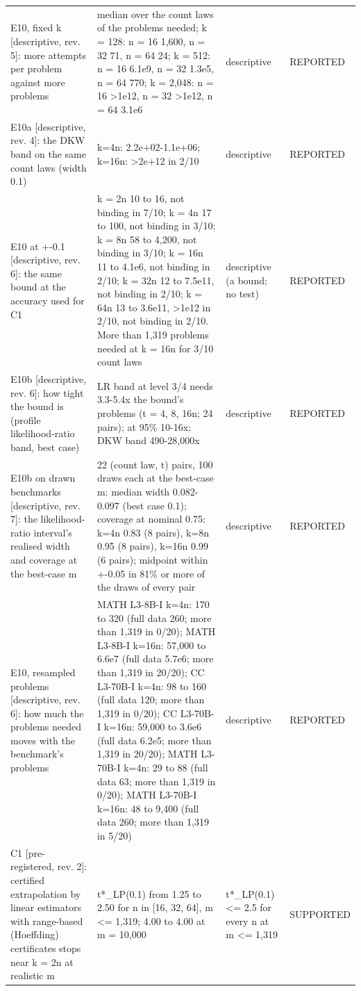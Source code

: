 \begin{table}[t]
\begin{tabular}{p{1.6in}p{2.0in}p{0.95in}p{0.75in}}
E10, fixed k [descriptive, rev. 5]: more attempts per problem against more problems & median over the count laws of the problems needed; k = 128: n = 16 1,600, n = 32 71, n = 64 24; k = 512: n = 16 6.1e9, n = 32 1.3e5, n = 64 770; k = 2,048: n = 16 >1e12, n = 32 >1e12, n = 64 3.1e6 & descriptive & REPORTED \\
E10a [descriptive, rev. 4]: the DKW band on the same count laws (width 0.1) & k=4n: 2.2e+02-1.1e+06; k=16n: >2e+12 in 2/10 & descriptive & REPORTED \\
E10 at +-0.1 [descriptive, rev. 6]: the same bound at the accuracy used for C1 & k = 2n 10 to 16, not binding in 7/10; k = 4n 17 to 100, not binding in 3/10; k = 8n 58 to 4,200, not binding in 3/10; k = 16n 11 to 4.1e6, not binding in 2/10; k = 32n 12 to 7.5e11, not binding in 2/10; k = 64n 13 to 3.6e11, >1e12 in 2/10, not binding in 2/10. More than 1,319 problems needed at k = 16n for 3/10 count laws & descriptive (a bound; no test) & REPORTED \\
E10b [descriptive, rev. 6]: how tight the bound is (profile likelihood-ratio band, best case) & LR band at level 3/4 needs 3.3-5.4x the bound's problems (t = 4, 8, 16n; 24 pairs); at 95\% 10-16x; DKW band 490-28,000x & descriptive & REPORTED \\
E10b on drawn benchmarks [descriptive, rev. 7]: the likelihood-ratio interval's realised width and coverage at the best-case m & 22 (count law, t) pairs, 100 draws each at the best-case m: median width 0.082-0.097 (best case 0.1); coverage at nominal 0.75: k=4n 0.83 (8 pairs), k=8n 0.95 (8 pairs), k=16n 0.99 (6 pairs); midpoint within +-0.05 in 81\% or more of the draws of every pair & descriptive & REPORTED \\
E10, resampled problems [descriptive, rev. 6]: how much the problems needed moves with the benchmark's problems & MATH L3-8B-I k=4n: 170 to 320 (full data 260; more than 1,319 in 0/20); MATH L3-8B-I k=16n: 57,000 to 6.6e7 (full data 5.7e6; more than 1,319 in 20/20); CC L3-70B-I k=4n: 98 to 160 (full data 120; more than 1,319 in 0/20); CC L3-70B-I k=16n: 59,000 to 3.6e6 (full data 6.2e5; more than 1,319 in 20/20); MATH L3-70B-I k=4n: 29 to 88 (full data 63; more than 1,319 in 0/20); MATH L3-70B-I k=16n: 48 to 9,400 (full data 260; more than 1,319 in 5/20) & descriptive & REPORTED \\
C1 [pre-registered, rev. 2]: certified extrapolation by linear estimators with range-based (Hoeffding) certificates stops near k = 2n at realistic m & t*\_LP(0.1) from 1.25 to 2.50 for n in [16, 32, 64], m <= 1,319; 4.00 to 4.00 at m = 10,000 & t*\_LP(0.1) <= 2.5 for every n at m <= 1,319 & SUPPORTED \\

\end{tabular}
\end{table}
